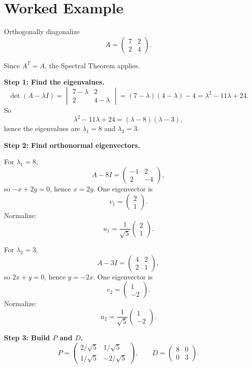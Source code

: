 \section{Worked Example}

Orthogonally diagonalize
\[
A=\begin{pmatrix}
7 & 2\\
2 & 4
\end{pmatrix}.
\]

Since $A^T=A$, the Spectral Theorem applies.

\textbf{Step 1: Find the eigenvalues.}
\[
\det(A-\lambda I)
=
\begin{vmatrix}
7-\lambda & 2\\
2 & 4-\lambda
\end{vmatrix}
=(7-\lambda)(4-\lambda)-4
=\lambda^2-11\lambda+24.
\]
So
\[
\lambda^2-11\lambda+24=(\lambda-8)(\lambda-3),
\]
hence the eigenvalues are $\lambda_1=8$ and $\lambda_2=3$.

\textbf{Step 2: Find orthonormal eigenvectors.}

For $\lambda_1=8$,
\[
A-8I=\begin{pmatrix}-1&2\\2&-4\end{pmatrix},
\]
so $-x+2y=0$, hence $x=2y$. One eigenvector is
\[
v_1=\begin{pmatrix}2\\1\end{pmatrix}.
\]
Normalize:
\[
u_1=\frac{1}{\sqrt{5}}\begin{pmatrix}2\\1\end{pmatrix}.
\]

For $\lambda_2=3$,
\[
A-3I=\begin{pmatrix}4&2\\2&1\end{pmatrix},
\]
so $2x+y=0$, hence $y=-2x$. One eigenvector is
\[
v_2=\begin{pmatrix}1\\-2\end{pmatrix}.
\]
Normalize:
\[
u_2=\frac{1}{\sqrt{5}}\begin{pmatrix}1\\-2\end{pmatrix}.
\]

\textbf{Step 3: Build $P$ and $D$.}
\[
P=\begin{pmatrix}
2/\sqrt{5} & 1/\sqrt{5}\\
1/\sqrt{5} & -2/\sqrt{5}
\end{pmatrix},
\qquad
D=\begin{pmatrix}
8 & 0\\
0 & 3
\end{pmatrix}.
\]

